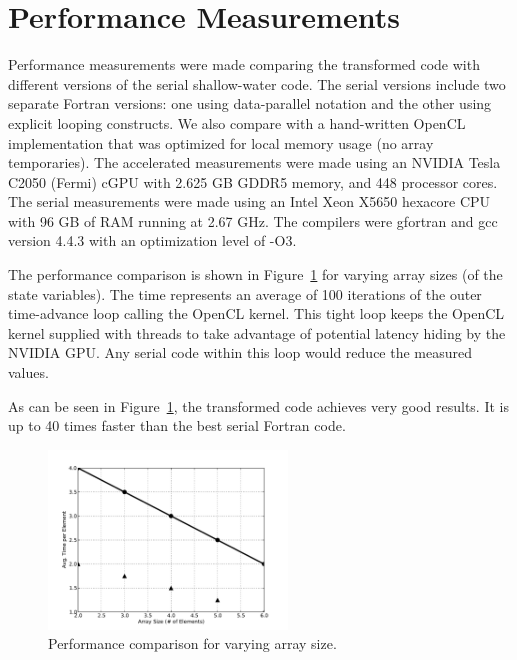 \section{Performance Measurements}

Performance measurements were made comparing the transformed code with
different versions of the serial shallow-water code.  The serial
versions include two separate Fortran versions:
one using data-parallel notation and the other using explicit looping
constructs.
We also compare with a hand-written OpenCL implementation
that was optimized for local memory usage (no array temporaries).  The
accelerated measurements were made using an NVIDIA Tesla C2050 (Fermi) cGPU with
2.625 GB GDDR5 memory, and 448 processor cores.  The serial
measurements were made using an Intel Xeon X5650 hexacore CPU with 96 GB of RAM
running at 2.67 GHz.  The compilers were gfortran and gcc version 4.4.3
with an optimization level of -O3.



The performance comparison is shown in Figure~\ref{fig:cl-performance} for
varying array sizes (of the state variables).  The time represents an average
of 100 iterations of the outer time-advance loop calling the OpenCL kernel.
This tight loop keeps the OpenCL kernel supplied with threads to take
advantage of potential latency hiding by the NVIDIA GPU.  Any serial code
within this loop would reduce the measured values.

As can be seen in Figure~\ref{fig:cl-performance}, the transformed code achieves very
good results.  It is up to 40 times faster than the best serial Fortran code.


\begin{figure}[!t]
\centering
\includegraphics[width=2.5in]{cl-performance.pdf}
\caption{Performance comparison for varying array size.}
\label{fig:cl-performance}
\end{figure}
